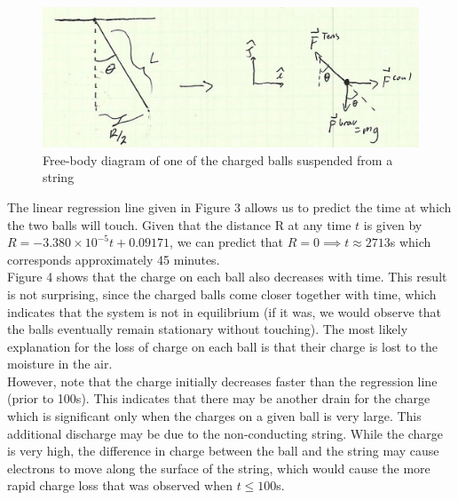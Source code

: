 \documentclass[oneside,12pt]{amsart}
\begin{document}
	\begin{figure}[h]
	\includegraphics[width=\linewidth,scale=0.01]{scan.png}
	\caption{Free-body diagram of one of the charged balls suspended from a string}
	\label{scn}
\end{figure}


\indent The linear regression line given in Figure 3 allows us to predict the time at which the two balls will touch. Given that the distance R at any time $t$ is given by $R = -3.380\times10^{-5}t + 0.09171$, we can predict that $R=0 \implies t \approx 2713$s which corresponds approximately 45 minutes.\\

\indent Figure 4 shows that the charge on each ball also decreases with time. This result is not surprising, since the charged balls come closer together with time, which indicates that the system is not in equilibrium (if it was, we would observe that the balls eventually remain stationary without touching). The most likely explanation for the loss of charge on each ball is that their charge is lost to the moisture in the air.\\

\indent However, note that the charge initially decreases faster than the regression line (prior to 100s). This indicates that there may be another drain for the charge which is significant only when the charges on a given ball is very large. This additional discharge may be due to the non-conducting string. While the charge is very high, the difference in charge between the ball and the string may cause electrons to move along the surface of the string, which would cause the more rapid charge loss that was observed when $t\le 100$s. 
	
\end{document}

